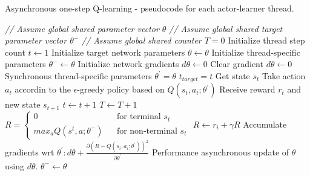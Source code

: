 \documentclass[12pt,a4paper]{article}
\begin{document}
\begin{algorithm} 
	\caption{Asynchronous one-step Q-learning - pseudocode for each actor-learner thread.}
	\label{asynchronous_n_step_q_learning}
	\begin{algorithmic}[1]
		\State \textit{// Assume global shared parameter vector $\theta$}
		\State \textit{// Assume global shared target parameter vector $\theta^{-}$}
		\State \textit{// Assume global shared counter $T = 0$}
		\State Initialize thread step count $t \leftarrow 1$
		\State Initialize target network parameters $\theta \leftarrow \theta$
		\State Initialize thread-specific parameters $\theta^{-} \leftarrow \theta$
		\State Initialize network gradients $d\theta \leftarrow 0$
		\Repeat 
			\State Clear gradient $d\theta \leftarrow 0$
			\State Synchronous thread-specific parameters $\theta^{'} = \theta$
			\State $t_{target} = t$
			\State Get state $s_{t}$
			\Repeat
				\State Take action $a_{t}$ accordin to the $\epsilon$-greedy policy based on $Q(s_{t}, a_{t};\theta^{'})$
				\State Receive reward $r_{t}$ and new state $s_{t+1}$
				\State $t \leftarrow t + 1$
				\State $T \leftarrow T + 1$
			\State $R = \left\lbrace
				\begin{array}{lcl}
					0 & & \text{for terminal }s_{t} \\
					max_{a}Q(s^{t}, a; \theta^{-}) & & \text{for non-terminal }s_{t}
				\end{array}	\right.$	
				\State $R \leftarrow r_{i} + \gamma R$
				\State Accumulate gradients wrt $\theta^{'} : d\theta + \frac{\partial(R - Q(s_{i},a_{i}; \theta^{'}))^{2}}{\partial{\theta^{'}}}$
			\EndFor	
			\State Performance asynchronous update of $\theta$ using $d\theta$.
				\State $\theta^{-} \leftarrow \theta$
			\EndIf
		
	\end{algorithmic}
\end{algorithm}
\end{document}
